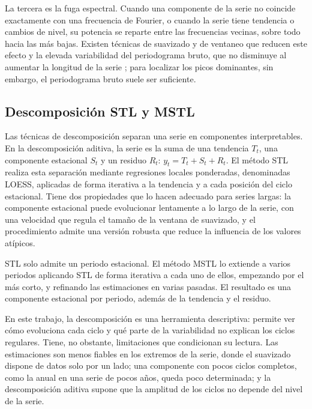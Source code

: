 La tercera es la fuga espectral. Cuando una componente de la serie no
coincide exactamente con una frecuencia de Fourier, o cuando la serie tiene
tendencia o cambios de nivel, su potencia se reparte entre las frecuencias
vecinas, sobre todo hacia las más bajas. Existen técnicas de suavizado y de
ventaneo que reducen este efecto y la elevada variabilidad del periodograma
bruto, que no disminuye al aumentar la longitud de la serie
\parencite{shumway2017time}; para localizar los picos dominantes, sin
embargo, el periodograma bruto suele ser suficiente.

\subsection{Descomposición STL y MSTL}\label{sec:mstl}

Las técnicas de descomposición separan una serie en componentes
interpretables. En la descomposición aditiva, la serie es la suma de una
tendencia $T_t$, una componente estacional $S_t$ y un residuo $R_t$:
$y_t = T_t + S_t + R_t$. El método STL \parencite{cleveland1990stl} realiza
esta separación mediante regresiones locales ponderadas, denominadas LOESS,
aplicadas de forma iterativa a la tendencia y a cada posición del ciclo
estacional. Tiene dos propiedades que lo hacen adecuado para series
largas: la componente estacional puede evolucionar lentamente a lo largo de
la serie, con una velocidad que regula el tamaño de la ventana de suavizado,
y el procedimiento admite una versión robusta que reduce la influencia de los
valores atípicos.

STL solo admite un periodo estacional. El método MSTL
\parencite{bandara2025mstl} lo extiende a varios periodos aplicando STL de
forma iterativa a cada uno de ellos, empezando por el más corto, y
refinando las estimaciones en varias pasadas. El resultado es una
componente estacional por periodo, además de la tendencia y el residuo.

En este trabajo, la descomposición es una herramienta descriptiva: permite
ver cómo evoluciona cada ciclo y qué parte de la variabilidad no explican los
ciclos regulares. Tiene, no obstante, limitaciones que condicionan su
lectura. Las estimaciones son menos fiables en los extremos de la serie,
donde el suavizado dispone de datos solo por un lado; una componente con
pocos ciclos completos, como la anual en una serie de pocos años, queda poco
determinada; y la descomposición aditiva supone que la amplitud de los ciclos
no depende del nivel de la serie.

